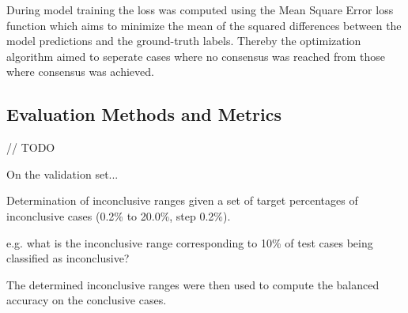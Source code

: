 During model training the loss was computed using the Mean Square Error loss function 
which aims to minimize the mean of the squared differences between the model predictions and the ground-truth labels.
Thereby the optimization algorithm aimed to seperate cases where no consensus was reached from those where 
consensus was achieved.


\subsection{Evaluation Methods and Metrics}
\label{subsec:determinationInconcl}

// TODO

On the validation set...

Determination of inconclusive ranges given a set of target percentages of inconclusive cases (0.2\% to 20.0\%, step 0.2\%).

e.g. what is the inconclusive range corresponding to 10\% of test cases being classified as inconclusive?

The determined inconclusive ranges were then used to compute the balanced accuracy on the conclusive cases.
